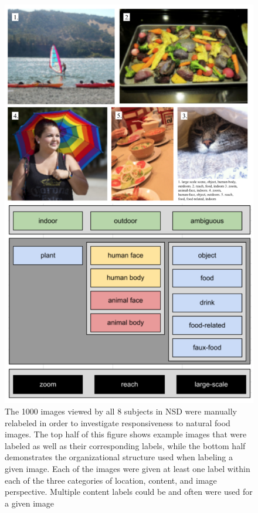 \documentclass[../thesis.tex]{subfiles}
\begin{document}
\begin{figure}
    \centering
    \includegraphics[scale=0.6]{fig1.png}
        \caption{The 1000 images viewed by all 8 subjects in NSD were manually relabeled in order to investigate responsiveness to natural food images. The top half of this figure shows example images that were labeled as well as their corresponding labels, while the bottom half demonstrates the organizational structure used when labeling a given image. Each of the images were given at least one label within each of the three categories of location, content, and image perspective. Multiple content labels could be and often were used for a given image} \label{fig1}
\end{figure}
\end{document}
